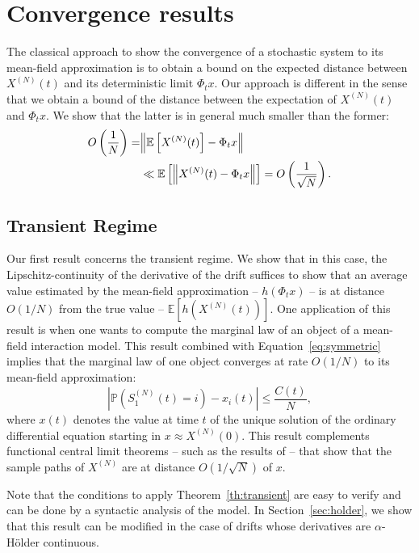 \documentclass[sigconf]{acmart}
\newcommand\SN{S^{(N)}}
\newcommand\XN{X^{(N)}}
\newcommand\esp[1]{{\mathchoice{\besp{#1}}{\sesp{#1}}{\sesp{#1}}{\sesp{#1}}}}
\newcommand\besp[1]{\mathbb{E}\left[#1\right]}
\newcommand\sesp[1]{\mathbb{E}[#1]}
\newcommand\norm[1]{{\mathchoice{\bnorm{#1}}{\snorm{#1}}{\snorm{#1}}{\snorm{#1}}}}
\newcommand\bnorm[1]{\left\|#1\right\|}
\newcommand\snorm[1]{\|#1\|}
\newcommand\abs[1]{\left|#1\right|}
\newcommand\p[1]{\left(#1\right)}
\newcommand\proba[1]{\mathbb{P}\left(#1\right)}
\begin{document}
\section{Convergence results}
\label{sec:convergence}

The classical approach to show the convergence of a stochastic system
to its mean-field approximation is to obtain a bound on the expected
distance between $\XN(t)$ and its deterministic limit $\Phi_tx$.
Our approach is different in the sense that we obtain a bound of the
distance between the expectation of $\XN(t)$ and $\Phi_tx$. We show
that the latter is in general much smaller than the former:
\begin{align*}
  O\p{\frac1N} =& \norm{\esp{\XN(t)} - \Phi_t x}\\
               &\ll \esp{\norm{\XN(t) - \Phi_t x}} =
                 O\p{\frac1{\sqrt{N}}}. 
\end{align*}


\subsection{Transient Regime}
\label{sec:transient}

Our first result concerns the transient regime. We show that in this
case, the Lipschitz-continuity of the derivative of the drift suffices
to show that an average value estimated by the mean-field
approximation -- $h(\Phi_tx)$ -- is at distance $O(1/N)$ from the true
value -- $\sesp{h(\XN(t))}$.  One application of this result is when
one wants to compute the marginal law of an object of a mean-field
interaction model.  This result combined with
Equation~\eqref{eq:symmetric} implies that the marginal law of one
object converges at rate $O(1/N)$ to its mean-field approximation:
\begin{equation*}
  \abs{\proba{\SN_1(t)=i} - x_i(t)} \le \frac{C(t)}{N},
\end{equation*}
where $x(t)$ denotes the value at time $t$ of the unique solution of
the ordinary differential equation starting in $x\approx\XN(0)$. This
result complements functional central limit theorems -- such as the
results of \cite{kurtz1978strong} -- that show that the sample paths
of $\XN$ are at distance $O(1/\sqrt{N})$ of $x$. %

Note that the conditions to apply Theorem~\ref{th:transient} are easy
to verify and can be done by a syntactic analysis of the model.  In
Section~\ref{sec:holder}, we show that this result can be modified in
the case of drifts whose derivatives are $\alpha$-Hölder continuous.
\end{document}
